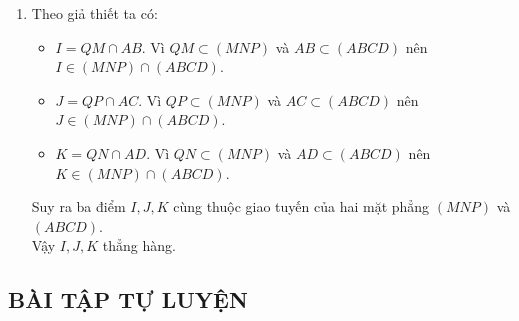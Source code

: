 \begin{vd}
{\begin{enumerate}
			\item[c)] Theo giả thiết ta có:
			\begin{itemize}
				\item $I = QM \cap AB$. Vì $QM \subset (MNP)$ và $AB \subset (ABCD)$ nên $I \in (MNP) \cap (ABCD)$.
				\item $J = QP \cap AC$. Vì $QP \subset (MNP)$ và $AC \subset (ABCD)$ nên $J \in (MNP) \cap (ABCD)$.
				\item $K = QN \cap AD$. Vì $QN \subset (MNP)$ và $AD \subset (ABCD)$ nên $K \in (MNP) \cap (ABCD)$.
			\end{itemize}
			Suy ra ba điểm $I, J, K$ cùng thuộc giao tuyến của hai mặt phẳng $(MNP)$ và $(ABCD)$.\\
			Vậy $I, J, K$ thẳng hàng.
		\end{enumerate}
	}
\end{vd}

\subsection{BÀI TẬP TỰ LUYỆN}


